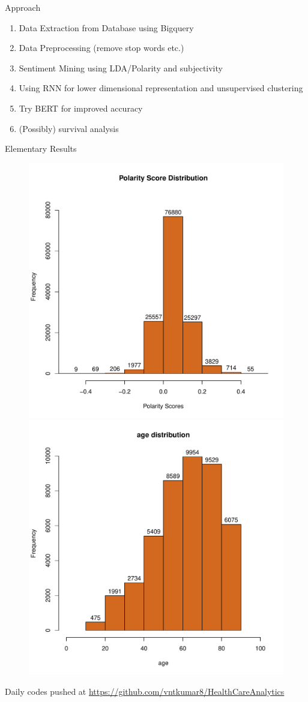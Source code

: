 \documentclass[11pt]{beamer}
\begin{document}
\begin{frame}{Approach}
\begin{enumerate}
	\item Data Extraction from Database using Bigquery
	\item Data Preprocessing (remove stop words etc.)
	\item Sentiment Mining using LDA/Polarity and subjectivity
	\item Using RNN for lower dimensional representation and unsupervised clustering
	\item Try BERT for improved accuracy 
	\item (Possibly) survival analysis 
\end{enumerate}
\end{frame}
\begin{frame}{Elementary Results}
	\begin{figure}
		\centering
		\includegraphics[width=0.48\linewidth]{pol}		\includegraphics[width=0.48\linewidth]{../report/img/age-distr}
		\label{fig:pol}
	\end{figure}
Daily codes pushed at \url{https://github.com/vntkumar8/HealthCareAnalytics}
\end{frame}
\end{document}
